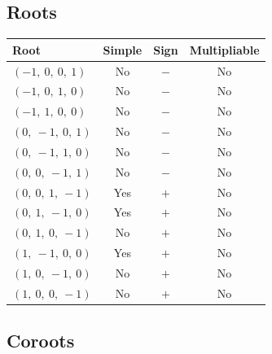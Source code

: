 \documentclass[11pt]{article}
\theoremstyle{definition}
\begin{document}
\subsection{Roots}

\begin{tabular}{|l|c|c|c|}
    \hline
    \textbf{Root} & \textbf{Simple} & \textbf{Sign} & \textbf{Multipliable} \\
    \hline
    $\left( -1, \  0, \  0, \  1\right)$ & No & $-$ & No \\
    \hline
    $\left( -1, \  0, \  1, \  0\right)$ & No & $-$ & No \\
    \hline
    $\left( -1, \  1, \  0, \  0\right)$ & No & $-$ & No \\
    \hline
    $\left( 0, \  -1, \  0, \  1\right)$ & No & $-$ & No \\
    \hline
    $\left( 0, \  -1, \  1, \  0\right)$ & No & $-$ & No \\
    \hline
    $\left( 0, \  0, \  -1, \  1\right)$ & No & $-$ & No \\
    \hline
    $\left( 0, \  0, \  1, \  -1\right)$ & Yes & $+$ & No \\
    \hline
    $\left( 0, \  1, \  -1, \  0\right)$ & Yes & $+$ & No \\
    \hline
    $\left( 0, \  1, \  0, \  -1\right)$ & No & $+$ & No \\
    \hline
    $\left( 1, \  -1, \  0, \  0\right)$ & Yes & $+$ & No \\
    \hline
    $\left( 1, \  0, \  -1, \  0\right)$ & No & $+$ & No \\
    \hline
    $\left( 1, \  0, \  0, \  -1\right)$ & No & $+$ & No \\
    \hline
\end{tabular}


\subsection{Coroots}
\end{document}
